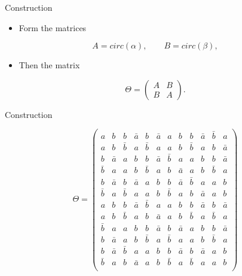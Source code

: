 \documentclass{beamer}
\begin{document}
\begin{frame}{Construction}

  \begin{itemize}
  \item Form the matrices
  \end{itemize}

  $$
  A=circ(\alpha), \qquad B=circ(\beta),
  $$

  \begin{itemize}
    \item Then the matrix
  \end{itemize}

  $$
  \Theta = \begin{pmatrix}
                A & B \\ B & A
              \end{pmatrix}.
  $$

\end{frame}

\begin{frame}{Construction}

  \[
    \Theta = 
    \left(
      \begin{array}{cccccc|cccccc}
        a&b&b&\bar{a}&b&\bar{a}&a&b&b&\bar{a}&\bar{b}&a\\
        a&b&\bar{b}&a&\bar{b}&a&a&b&\bar{b}&a&b&\bar{a}\\
        b&\bar{a}&a&b&b&\bar{a}&\bar{b}&a&a&b&b&\bar{a}\\
        \bar{b}&a&a&b&\bar{b}&a&b&\bar{a}&a&b&\bar{b}&a\\
        b&\bar{a}&b&\bar{a}&a&b&b&\bar{a}&\bar{b}&a&a&b\\
        \bar{b}&a&\bar{b}&a&a&b&\bar{b}&a&b&\bar{a}&a&b\\ \hline
        a&b&b&\bar{a}&\bar{b}&a&a&b&b&\bar{a}&b&\bar{a}\\
        a&b&\bar{b}&a&b&\bar{a}&a&b&\bar{b}&a&\bar{b}&a\\
        \bar{b}&a&a&b&b&\bar{a}&b&\bar{a}&a&b&b&\bar{a}\\
        b&\bar{a}&a&b&\bar{b}&a&\bar{b}&a&a&b&\bar{b}&a\\
        b&\bar{a}&\bar{b}&a&a&b&b&\bar{a}&b&\bar{a}&a&b\\
        \bar{b}&a&b&\bar{a}&a&b&\bar{b}&a&\bar{b}&a&a&b\\
      \end{array}
    \right)
  \]
  
\end{frame}
\end{document}

